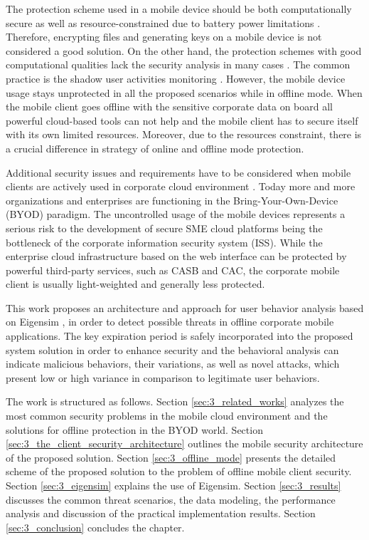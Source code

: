 {The protection scheme used in a mobile device should be both computationally secure as well as resource-constrained due to battery power limitations \cite{khan2015cloud}. Therefore, encrypting files and generating keys on a mobile device is not considered a good solution. On the other hand, the protection schemes with good computational qualities lack the security analysis in many cases \cite{khan2014bss}. The common practice is the shadow user activities monitoring \cite{yovel2014}. However, the mobile device usage stays unprotected in all the proposed scenarios while in offline mode. When the mobile client goes offline with the sensitive corporate data on board all powerful cloud-based tools can not help and the mobile client has to secure itself with its own limited resources. Moreover, due to the resources constraint, there is a crucial difference in strategy of online and offline mode protection.

Additional security issues and requirements have to be considered when mobile clients are actively used in corporate cloud environment \cite{yovel2014}. Today more and more organizations and enterprises are functioning in the Bring-Your-Own-Device (BYOD) paradigm. The uncontrolled usage of the mobile devices represents a serious risk to the development of secure SME cloud platforms being the bottleneck of the corporate information security system (ISS). While the enterprise cloud infrastructure based on the web interface can be protected by powerful third-party services, such as CASB and CAC, the corporate mobile client is usually light-weighted and generally less protected. 

This work proposes an architecture and approach for user behavior analysis based on Eigensim \cite{vieira2017model}, in order to detect possible threats in offline corporate mobile applications. The key expiration period is safely incorporated into the proposed system solution in order to enhance security and the behavioral analysis can indicate malicious behaviors, their variations, as well as novel attacks, which present low or high variance in comparison to legitimate user behaviors.

The work is structured as follows. Section \ref{sec:3_related_works} analyzes the most common security problems in the mobile cloud environment and the solutions for offline protection in the BYOD world. Section \ref{sec:3_the_client_security_architecture} outlines the mobile security architecture of the proposed solution. Section \ref{sec:3_offline_mode} presents the detailed scheme of the proposed solution to the problem of offline mobile client security. Section \ref{sec:3_eigensim} explains the use of Eigensim. Section \ref{sec:3_results} discusses the common threat scenarios, the data modeling, the performance analysis and discussion of the practical implementation results. Section \ref{sec:3_conclusion} concludes the chapter.

}
